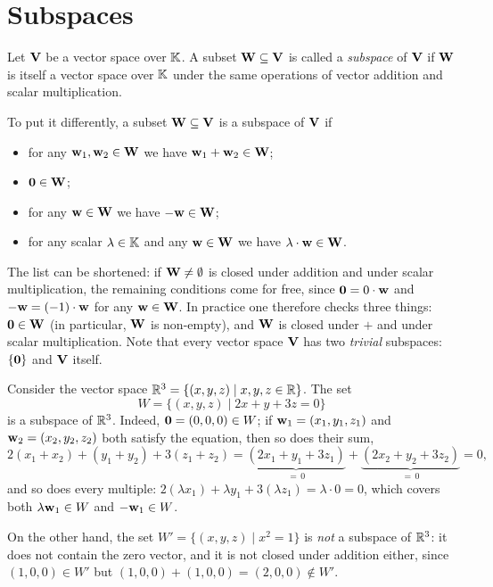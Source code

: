 \section{Subspaces}

\begin{definition}
Let $\mathbf{V}$ be a vector space over $\mathbb{K}$. A subset $\mathbf{W}\subseteq \mathbf{V}$ is called a \emph{subspace} of $\mathbf{V}$ if $\mathbf{W}$ is
itself a vector space over $\mathbb{K}$ under the same operations of vector addition and scalar multiplication.
\end{definition}

\noindent To put it differently, a subset $\mathbf{W}\subseteq \mathbf{V}$ is a subspace of $\mathbf{V}$ if
\begin{itemize}
\item for any $\mathbf{w}_1,\mathbf{w}_2\in \mathbf{W}$ we have $\mathbf{w}_1+\mathbf{w}_2\in \mathbf{W}$;
\item $\mathbf{0}\in \mathbf{W}$;
\item for any $\mathbf{w}\in \mathbf{W}$ we have $-\mathbf{w}\in \mathbf{W}$;
\item for any scalar $\lambda\in \mathbb{K}$ and any $\mathbf{w}\in \mathbf{W}$ we have $\lambda\cdot \mathbf{w}\in \mathbf{W}$.
\end{itemize}

\begin{remark}
The list can be shortened: if $\mathbf{W}\neq\emptyset$ is closed under addition and under scalar multiplication,
the remaining conditions come for free, since $\mathbf{0} = 0\cdot\mathbf{w}$ and $-\mathbf{w} = (-1)\cdot\mathbf{w}$ for any
$\mathbf{w}\in\mathbf{W}$. In practice one therefore checks three things: $\mathbf{0}\in\mathbf{W}$ (in particular, $\mathbf{W}$ is non-empty),
and $\mathbf{W}$ is closed under $+$ and under scalar multiplication. Note that every vector space $\mathbf{V}$ has two
\emph{trivial} subspaces: $\{\mathbf{0}\}$ and $\mathbf{V}$ itself.
\end{remark}

\begin{example}
Consider the vector space $\mathbb{R}^3 = \{(x,y,z)\mid x,y,z\in\mathbb{R}\}$. The set
\[
W = \{(x,y,z)\mid 2x+y+3z = 0\}
\]
is a subspace of $\mathbb{R}^3$. Indeed, $\mathbf{0} = (0,0,0)\in W$; if $\mathbf{w}_1=(x_1,y_1,z_1)$ and $\mathbf{w}_2=(x_2,y_2,z_2)$
both satisfy the equation, then so does their sum,
\[
2(x_1+x_2)+(y_1+y_2)+3(z_1+z_2) = \underbrace{(2x_1+y_1+3z_1)}_{=\,0} + \underbrace{(2x_2+y_2+3z_2)}_{=\,0} = 0,
\]
and so does every multiple: $2(\lambda x_1)+\lambda y_1+3(\lambda z_1) = \lambda\cdot 0 = 0$, which covers
both $\lambda\mathbf{w}_1\in W$ and $-\mathbf{w}_1\in W$.

On the other hand, the set $W' = \{(x,y,z)\mid x^2 = 1\}$ is \emph{not} a subspace of $\mathbb{R}^3$: it does not
contain the zero vector, and it is not closed under addition either, since $(1,0,0)\in W'$ but
$(1,0,0)+(1,0,0) = (2,0,0)\notin W'$.
\end{example}

